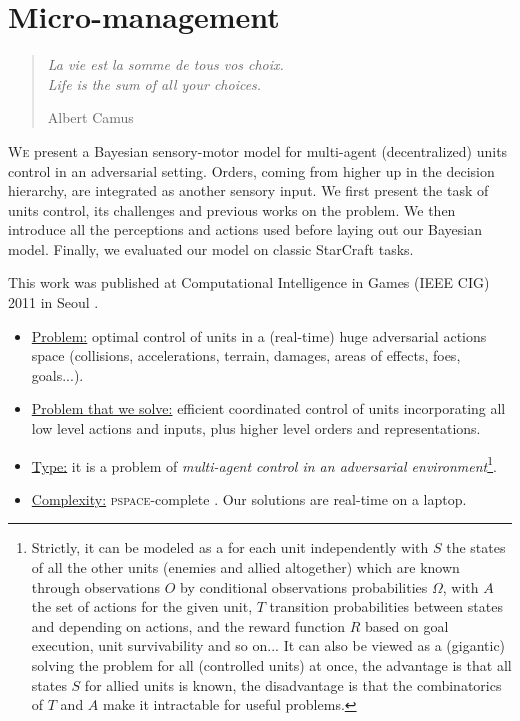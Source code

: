 \chapter{Micro-management}
\label{chapter:micro}
\begin{quotation}
\noindent
\textit{La vie est la somme de tous vos choix.
\vspace{0.2cm}\\
Life is the sum of all your choices.}
\begin{flushright}Albert Camus\end{flushright}
\end{quotation}

\lettrine{W}{e} present a Bayesian sensory-motor model for multi-agent (decentralized) units control in an adversarial setting. Orders, coming from higher up in the decision hierarchy, are integrated as another sensory input. We first present the task of units control, its challenges and previous works on the problem. We then introduce all the perceptions and actions used before laying out our Bayesian model. Finally, we evaluated our model on classic StarCraft  tasks. 

This work was published at Computational Intelligence in Games (IEEE CIG) 2011 in Seoul \citep{SYNNAEVE:Micro}.


\begin{itemize}
\item \underline{Problem:} optimal control of units in a (real-time) huge adversarial actions space (collisions, accelerations, terrain, damages, areas of effects, foes, goals...).
\item \underline{Problem that we solve:} efficient coordinated control of units incorporating all low level actions and inputs, plus higher level orders and representations.
\item \underline{Type:} it is a problem of \textit{multi-agent control in an adversarial environment}\footnote{Strictly, it can be modeled as a  for each unit independently with $S$ the states of all the other units (enemies and allied altogether) which are known through observations $O$ by conditional observations probabilities $\Omega$, with $A$ the set of actions for the given unit, $T$ transition probabilities between states and depending on actions, and the reward function $R$ based on goal execution, unit survivability and so on... It can also be viewed as a (gigantic)  solving the problem for all (controlled units) at once, the advantage is that all states $S$ for allied units is known, the disadvantage is that the combinatorics of $T$ and $A$ make it intractable for useful problems.}.
\item \underline{Complexity:} \textsc{pspace}-complete \citep{Papadimitriou87,GamingComplexity}. Our solutions are real-time on a laptop.
\end{itemize}

